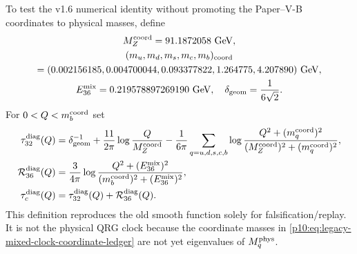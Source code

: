 \documentclass[12pt,a4paper]{article}
\providecommand{\deltageom}{\delta_{\rm geom}}
\begin{document}
\begin{definition}
\label{p10:def:legacy-mixed-clock-diagnostic}
To test the v1.6 numerical identity without promoting the Paper--V-B coordinates to physical masses, define
\begin{equation}
\label{p10:eq:legacy-mixed-clock-coordinate-ledger}
\begin{gathered}
M_Z^{\rm coord}=91.1872058\ \mathrm{GeV},\\
(m_u,m_d,m_s,m_c,m_b)_{\rm coord}\\
=(0.002156185,0.004700044,0.093377822,1.264775,4.207890)\ \mathrm{GeV},\\
E_{36}^{\rm mix}=0.219578897269190\ \mathrm{GeV},\quad
\deltageom=\frac1{6\sqrt2}.
\end{gathered}
\end{equation}
For $0<Q<m_b^{\rm coord}$ set
\begin{equation}
\label{p10:eq:legacy-mixed-clock-explicit}
\begin{split}
\tau_{32}^{\rm diag}(Q)
={}&\deltageom^{-1}+\frac{11}{2\pi}\log\frac{Q}{M_Z^{\rm coord}}
-\frac1{6\pi}\sum_{q=u,d,s,c,b}
\log\frac{Q^2+(m_q^{\rm coord})^2}{(M_Z^{\rm coord})^2+(m_q^{\rm coord})^2},\\
\mathcal R_{36}^{\rm diag}(Q)
={}&\frac3{4\pi}\log\frac{Q^2+(E_{36}^{\rm mix})^2}{(m_b^{\rm coord})^2+(E_{36}^{\rm mix})^2},\\
\tau_c^{\rm diag}(Q)={}&\tau_{32}^{\rm diag}(Q)+\mathcal R_{36}^{\rm diag}(Q).
\end{split}
\end{equation}
This definition reproduces the old smooth function solely for falsification/replay.  It is not the physical QRG clock because the coordinate masses in \eqref{p10:eq:legacy-mixed-clock-coordinate-ledger} are not yet eigenvalues of $M_q^{\rm phys}$.
\end{definition}
\end{document}

